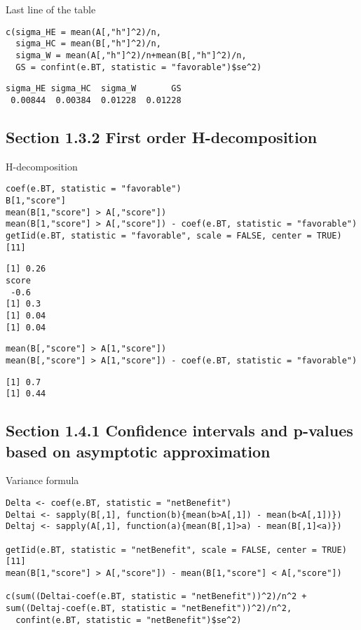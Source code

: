 \documentclass[12pt]{article}
\begin{document}
Last line of the table
\lstset{language=r,label= ,caption= ,captionpos=b,numbers=none}
\begin{lstlisting}
c(sigma_HE = mean(A[,"h"]^2)/n,
  sigma_HC = mean(B[,"h"]^2)/n,
  sigma_W = mean(A[,"h"]^2)/n+mean(B[,"h"]^2)/n,
  GS = confint(e.BT, statistic = "favorable")$se^2)
\end{lstlisting}

\begin{verbatim}
sigma_HE sigma_HC  sigma_W       GS 
 0.00844  0.00384  0.01228  0.01228
\end{verbatim}


\subsection{Section 1.3.2 First order H-decomposition}
\label{sec:orgd20f338}

H-decomposition
\lstset{language=r,label= ,caption= ,captionpos=b,numbers=none}
\begin{lstlisting}
coef(e.BT, statistic = "favorable")
B[1,"score"]
mean(B[1,"score"] > A[,"score"])
mean(B[1,"score"] > A[,"score"]) - coef(e.BT, statistic = "favorable")
getIid(e.BT, statistic = "favorable", scale = FALSE, center = TRUE)[11]
\end{lstlisting}

\begin{verbatim}
[1] 0.26
score 
 -0.6
[1] 0.3
[1] 0.04
[1] 0.04
\end{verbatim}


\lstset{language=r,label= ,caption= ,captionpos=b,numbers=none}
\begin{lstlisting}
mean(B[,"score"] > A[1,"score"])
mean(B[,"score"] > A[1,"score"]) - coef(e.BT, statistic = "favorable")
\end{lstlisting}

\begin{verbatim}
[1] 0.7
[1] 0.44
\end{verbatim}

\subsection{Section 1.4.1 Confidence intervals and p-values based on asymptotic approximation}
\label{sec:org846f0ce}

Variance formula
\lstset{language=r,label= ,caption= ,captionpos=b,numbers=none}
\begin{lstlisting}
Delta <- coef(e.BT, statistic = "netBenefit")
Deltai <- sapply(B[,1], function(b){mean(b>A[,1]) - mean(b<A[,1])})
Deltaj <- sapply(A[,1], function(a){mean(B[,1]>a) - mean(B[,1]<a)})

getIid(e.BT, statistic = "netBenefit", scale = FALSE, center = TRUE)[11]
mean(B[1,"score"] > A[,"score"]) - mean(B[1,"score"] < A[,"score"])

c(sum((Deltai-coef(e.BT, statistic = "netBenefit"))^2)/n^2 + sum((Deltaj-coef(e.BT, statistic = "netBenefit"))^2)/n^2,
  confint(e.BT, statistic = "netBenefit")$se^2)
\end{lstlisting}
\end{document}
